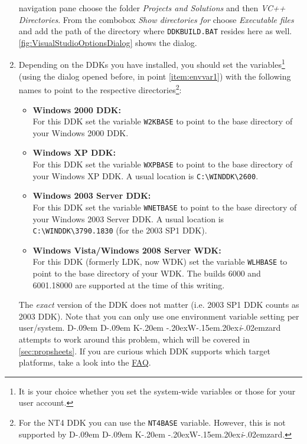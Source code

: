 \documentclass[a4paper,titlepage]{report}
\def\ddkwiz{D\kern-.09em D\kern-.09em K\kern-.20em \raise-.20ex\hbox{W}\kern-.15em\raise.20ex\hbox{\it{i}}\kern-.02em{zard}}
\begin{document}
\begin{enumerate}
    navigation pane choose the folder \emph{Projects and Solutions} and then \emph{VC++ Directories}.
    From the combobox \emph{Show directories for} choose \emph{Executable files} and add the
    path of the directory where \texttt{DDKBUILD.BAT} resides here as well.
    \autoref{fig:VisualStudioOptionsDialog} shows the dialog.
  \item \label{item:envvar2}
    Depending on the DDKs you have installed, you should set the variables\footnote{It is your
    choice whether you set the system-wide variables or those for your user account.} (using
    the dialog opened before, in point \ref{item:envvar1}) with the following names to point to the
    respective directories\footnote{For the NT4 DDK you can use the \texttt{NT4BASE} variable.
    However, this is not supported by \ddkwiz{}.}:
    \begin{itemize}
        \item
          \textbf{Windows 2000 DDK:}\\
            For this DDK set the variable \texttt{W2KBASE} to point to the base directory of your
            Windows 2000 DDK.
        \item
          \textbf{Windows XP DDK:}\\
            For this DDK set the variable \texttt{WXPBASE} to point to the base directory of your
            Windows XP DDK. A usual location is \verb+C:\WINDDK\2600+.
        \item
          \textbf{Windows 2003 Server DDK:}\\
            For this DDK set the variable \texttt{WNETBASE} to point to the base directory of your
            Windows 2003 Server DDK. A usual location is \verb+C:\WINDDK\3790.1830+
            (for the 2003 SP1 DDK).
        \item
          \textbf{Windows Vista/Windows 2008 Server WDK:}\\
            For this DDK (formerly LDK, now WDK) set the variable \texttt{WLHBASE} to point to the base
            directory of your WDK. The builds 6000 and 6001.18000 are supported at the time of this writing.
    \end{itemize}
    The \emph{exact} version of the DDK does not matter (i.e. 2003 SP1 DDK counts as 2003 DDK).
    Note that you can only use one environment variable setting per user/system. \ddkwiz{}
    attempts to work around this problem, which will be covered in \autoref{sec:propsheets}.
    If you are curious which DDK supports which target platforms, take a look into the
    \hyperref[cha:faq]{FAQ}.
\end{enumerate}
\end{document}
